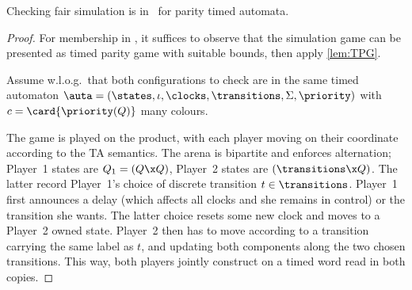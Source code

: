 \begin{theorem}
    \label{lem:GFGTA:fairsim-ub}
    \label{lem:GFGTA:fairsim}
    Checking fair simulation is in \EXPTIME\ for parity timed automata.
\end{theorem}
\begin{proof}
For membership in \EXPTIME, it suffices to observe that the simulation game can be presented as timed parity game with suitable bounds, then apply \cref{lem:TPG}.

Assume w.l.o.g.\ that both configurations to check are in the same timed automaton
$\auta = (\states,\iota,\clocks,\transitions,\Sigma,\priority)$ with $c=\card{\priority(Q)}$ many colours.

The game is played on the product, with each player moving on their coordinate according to the TA semantics.
The arena is bipartite and enforces alternation; Player~1 states are $Q_1=(Q\x Q)$, Player~2 states are $(\transitions\x Q)$.
The latter record Player~1's choice of discrete transition $t\in\transitions$.
Player~1 first announces a delay (which affects all clocks and she remains in control) or the transition she wants.
The latter choice resets some new clock and moves to a Player~2 owned state. 
Player~2 then has to move according to a transition carrying the same label as $t$,
and updating both components along the two chosen transitions.
This way, both players jointly construct on a timed word read in both copies.


\end{proof}
